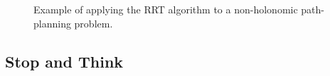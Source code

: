\begin{figure}
\begin{center}
 \hspace{.5em}
 \hspace{.5em}
\end{center}
\caption{Example of applying the RRT algorithm to a non-holonomic
  path-planning problem. }
\label{fig:rrt_dubins_path}
\end{figure}


\subsection*{Stop and Think}


